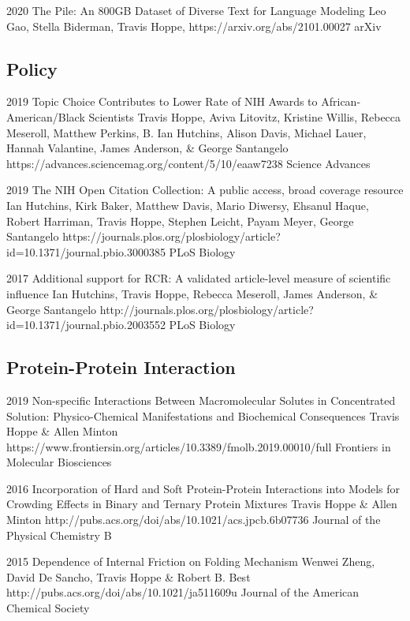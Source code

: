 \documentclass[]{scrartcl}
\begin{document}
\begin{cleanCV}
\Paper
{2020}
{The Pile: An 800GB Dataset of Diverse Text for Language Modeling}
{Leo Gao, Stella Biderman, Travis Hoppe, \etal}
{https://arxiv.org/abs/2101.00027}
{arXiv}


\subsection{Policy}

\Paper
{2019}
{Topic Choice Contributes to Lower Rate of NIH Awards to African-American/Black Scientists}
{Travis Hoppe, Aviva Litovitz, Kristine Willis, Rebecca Meseroll, Matthew Perkins, B. Ian Hutchins, Alison Davis, Michael Lauer, Hannah Valantine, James Anderson, \& George Santangelo}
{https://advances.sciencemag.org/content/5/10/eaaw7238}
{Science Advances}

\Paper
{2019}
{The NIH Open Citation Collection: A public access, broad coverage resource}
{Ian Hutchins, Kirk Baker, Matthew Davis, Mario Diwersy, Ehsanul Haque, Robert Harriman, Travis Hoppe, Stephen Leicht, Payam Meyer, George Santangelo}
{https://journals.plos.org/plosbiology/article?id=10.1371/journal.pbio.3000385}
{PLoS Biology}


\Paper
{2017}
{Additional support for RCR: A validated article-level measure of scientific influence}
{Ian Hutchins, Travis Hoppe, Rebecca Meseroll, James Anderson, \& George Santangelo}
{http://journals.plos.org/plosbiology/article?id=10.1371/journal.pbio.2003552}
{PLoS Biology}


\subsection{Protein-Protein Interaction}

\Paper
{2019}
{Non-specific Interactions Between Macromolecular Solutes in Concentrated Solution: Physico-Chemical Manifestations and Biochemical Consequences}
{Travis Hoppe \& Allen Minton}
{https://www.frontiersin.org/articles/10.3389/fmolb.2019.00010/full}
{Frontiers in Molecular Biosciences}


\Paper
{2016}
{Incorporation of Hard and Soft Protein-Protein Interactions into Models for Crowding Effects in Binary and Ternary Protein Mixtures}
{Travis Hoppe \& Allen Minton}
{http://pubs.acs.org/doi/abs/10.1021/acs.jpcb.6b07736}
{Journal of the Physical Chemistry B}

\Paper
{2015}
{Dependence of Internal Friction on Folding Mechanism}
{Wenwei Zheng, David De Sancho, Travis Hoppe \& Robert B. Best}
{http://pubs.acs.org/doi/abs/10.1021/ja511609u}
{Journal of the American Chemical Society}


\end{cleanCV}
\end{document}
